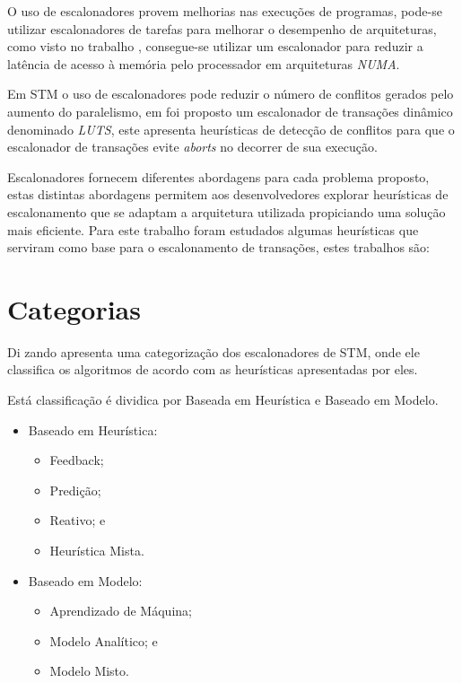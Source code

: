 \documentclass[diss,capa]{texufpel}
\begin{document}
O uso de escalonadores provem melhorias nas execuções de programas, pode-se utilizar escalonadores de tarefas para melhorar o desempenho de arquiteturas, como visto no trabalho \cite{Rodolfo:2014}, consegue-se utilizar um escalonador para reduzir a latência de acesso à memória pelo processador em arquiteturas \emph{NUMA}.

Em STM o uso de escalonadores pode reduzir o número de conflitos gerados pelo aumento do paralelismo, em \cite{Nicacio2012} foi proposto um escalonador de transações dinâmico denominado \emph{LUTS}, este apresenta heurísticas de detecção de conflitos para que o escalonador de transações evite \emph{aborts} no decorrer de sua execução.



Escalonadores fornecem diferentes abordagens para cada problema proposto, estas distintas abordagens permitem aos desenvolvedores explorar heurísticas de escalonamento que se adaptam a arquitetura utilizada propiciando uma solução mais eficiente. Para este trabalho foram estudados algumas heurísticas que serviram como base para o escalonamento de transações, estes trabalhos são:

\section{Categorias}

Di zando apresenta uma categorização dos escalonadores de STM, onde ele classifica os algoritmos de acordo com as heurísticas apresentadas por eles.

Está classificação é dividica por Baseada em Heurística e Baseado em Modelo.

\begin{itemize}
	\item Baseado em Heurística:
	\begin{itemize}
	    \item Feedback;
	    \item Predição;
	    \item Reativo; e
	    \item Heurística Mista.
	\end{itemize}
	\item Baseado em Modelo:
	\begin{itemize}
	    \item Aprendizado de Máquina;
	    \item Modelo Analítico; e
	    \item Modelo Misto.
	\end{itemize}
\end{itemize}
\end{document}
